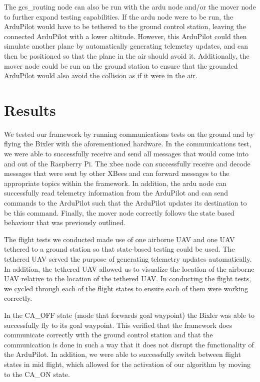 \documentclass[conference]{IEEEtran}
\begin{document}
The gcs\_routing node can also be run with the ardu node and/or the mover node to further expand testing capabilities.  If the ardu node were to be run, the ArduPilot would have to be tethered to the ground control station, leaving the connected ArduPilot with a lower altitude.  However, this ArduPilot could then simulate another plane by automatically generating telemetry updates, and can then be positioned so that the plane in the air should avoid it.  Additionally, the mover node could be run on the ground station to ensure that the grounded ArduPilot would also avoid the collision as if it were in the air.



\section{Results}
\label{sec:results}

We tested our framework by running communications tests on the ground and by flying the Bixler with the aforementioned hardware. In the communications test, we were able to successfully receive and send all messages that would come into and out of the Raspberry Pi.  The xbee node can successfully receive and decode messages that were sent by other XBees and can forward messages to the appropriate topics within the framework.  In addition, the ardu node can successfully read telemetry information from the ArduPilot and can send commands to the ArduPilot such that the ArduPilot updates its destination to be this command.  Finally, the mover node correctly follows the state based behaviour that was previously outlined.  

The flight tests we conducted made use of one airborne UAV and one UAV tethered to a ground station so that state-based testing could be used.  The tethered UAV served the purpose of generating telemetry updates automatically. In addition, the tethered UAV allowed us to visualize the location of the airborne UAV relative to the location of the tethered UAV. In conducting the flight tests, we cycled through each of the flight states to ensure each of them were working correctly.

 In the CA\_OFF state (mode that forwards goal waypoint) the Bixler was able to successfully fly to its goal waypoint.  This verified that the framework does communicate correctly with the ground control station and that the communication is done in such a way that it does not disrupt the functionality of the ArduPilot. In addition, we were able to successfully switch between flight states in mid flight, which allowed for the activation of our algorithm by moving to the CA\_ON state. 
\end{document}

